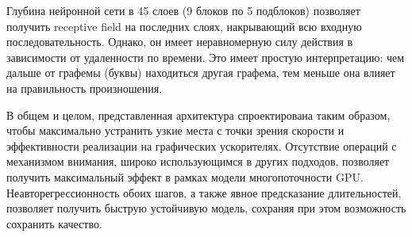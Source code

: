 Глубина нейронной сети в 45 слоев (9 блоков по 5 подблоков) позволяет получить receptive field на последних слоях, накрывающий всю входную последовательность. Однако, он имеет неравномерную силу действия в зависимости от удаленности по времени. Это имеет простую интерпретацию: чем дальше от графемы (буквы) находиться другая графема, тем меньше она влияет на правильность произношения.

В общем и целом, представленная архитектура спроектирована таким образом, чтобы максимально устранить узкие места с точки зрения скорости и эффективности реализации на графических ускорителях. Отсутствие операций с механизмом внимания, широко использующимся в других подходов, позволяет получить максимальный эффект в рамках модели многопоточности GPU. Неавторегрессионность обоих шагов, а также явное предсказание длительностей, позволяет получить быструю устойчивую модель, сохраняя при этом возможность сохранить качество.